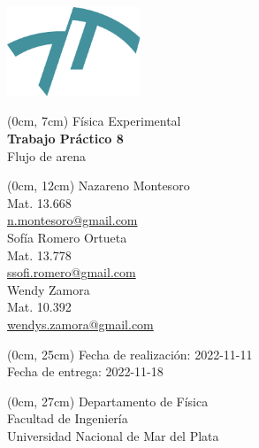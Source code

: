 \newcommand{\materia}[1]{{\huge #1}\\\vspace{0.5cm}}
\newcommand{\titulo}[1]{{\Huge \textbf{#1}}\\\vspace{0.5cm}}
\newcommand{\subtitulo}[1]{{\huge #1}\\\vspace{0.5cm}}
\newcommand{\autor}[3]{#1\\{\small Mat. #2\\\href{mailto:#3}{#3}}\\\vspace{0.7cm}}
\newcommand{\fecha}[4]{{\small Fecha de #1: #4-#3-#2}\\} %
\newcommand{\departamento}[1]{{\small Departamento de #1\\Facultad de Ingeniería\\Universidad Nacional de Mar del Plata}}
\newenvironment{mytitlepage}
    {\pagenumbering{gobble}\begin{center}}
    {\end{center}\newpage\pagenumbering{arabic}}

\begin{mytitlepage}
    \includegraphics[width=4cm]{img/logo-fi.pdf}
   
    \begin{textblock*}{\paperwidth}(0cm, 7cm)
    \materia{Física Experimental}
    \titulo{Trabajo Práctico 8}
    \subtitulo{Flujo de arena}
    \end{textblock*}
    
    \begin{textblock*}{\paperwidth}(0cm, 12cm)
    \autor{Nazareno Montesoro}{13.668}{n.montesoro@gmail.com}
    \autor{Sofía Romero Ortueta}{13.778}{ssofi.romero@gmail.com}
    \autor{Wendy Zamora}{10.392}{wendys.zamora@gmail.com}
    \end{textblock*}
    
    \begin{textblock*}{\paperwidth}(0cm, 25cm) 
    \fecha{realización}{11}{11}{2022}
    \fecha{entrega}{18}{11}{2022}
    \end{textblock*}
    
    \begin{textblock*}{\paperwidth}(0cm, 27cm) 
    \departamento{Física}
    \end{textblock*}
\end{mytitlepage}
